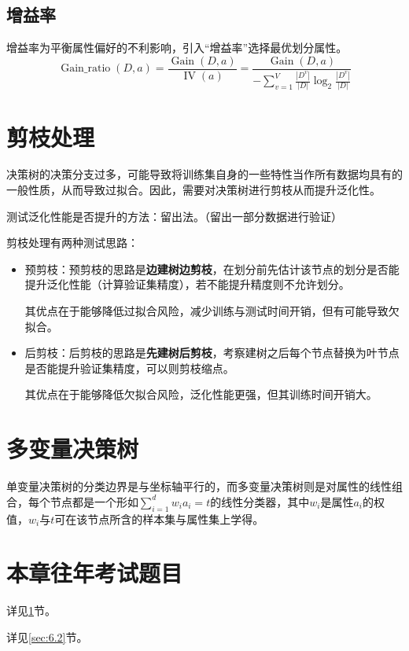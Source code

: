 \subsection{增益率}
增益率为平衡属性偏好的不利影响，引入“增益率”选择最优划分属性。
\[
\operatorname{Gain\_ ratio}(D, a)=\frac{\operatorname{Gain}(D, a)}{\operatorname{IV}(a)} = \frac{\operatorname{Gain}(D,a)}{-\sum_{v=1}^{V}\frac{\left|D^{v}\right|}{|D|} \log _{2} \frac{\left|D^{v}\right|}{|D|}}
\]

\section{剪枝处理}\label{sec:6.3}
决策树的决策分支过多，可能导致将训练集自身的一些特性当作所有数据均具有的一般性质，从而导致过拟合。因此，需要对决策树进行剪枝从而提升泛化性。

测试泛化性能是否提升的方法：留出法。（留出一部分数据进行验证）

剪枝处理有两种测试思路：
\begin{itemize}
    \item 预剪枝：预剪枝的思路是\textbf{边建树边剪枝}，在划分前先估计该节点的划分是否能提升泛化性能（计算验证集精度），若不能提升精度则不允许划分。

    其优点在于能够降低过拟合风险，减少训练与测试时间开销，但有可能导致欠拟合。

    \item 后剪枝：后剪枝的思路是\textbf{先建树后剪枝}，考察建树之后每个节点替换为叶节点是否能提升验证集精度，可以则剪枝缩点。

    其优点在于能够降低欠拟合风险，泛化性能更强，但其训练时间开销大。
\end{itemize}

\section{多变量决策树}\label{sec:6.4}

单变量决策树的分类边界是与坐标轴平行的，而多变量决策树则是对属性的线性组合，每个节点都是一个形如$\sum_{i=1}^d w_i a_i=t$的线性分类器，其中$ w_i$是属性$a_i$的权值，$w_i$与$t$可在该节点所含的样本集与属性集上学得。

\section{本章往年考试题目}\label{sec:6.5}


详见\ref{sec:6.3}节。


详见\ref{sec:6.2}节。
